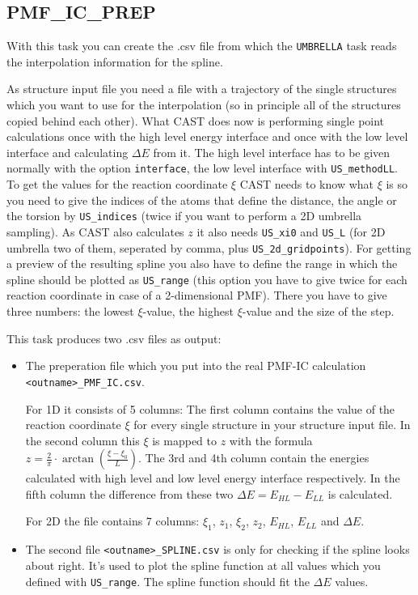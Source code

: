 \documentclass[10pt,a4paper]{article} %
\begin{document}
    \subsection{PMF\_IC\_PREP}
    
    With this task you can create the .csv file from which the \texttt{UMBRELLA} task reads the interpolation information for the spline. 
    
    As structure input file you need a file with a trajectory of the single structures which you want to use for the interpolation (so in principle all of the structures copied behind each other). What CAST does now is performing single point calculations once with the high level energy interface and once with the low level interface and calculating $\Delta E$ from it. The high level interface has to be given normally with the option \texttt{interface}, the low level interface with \texttt{US\_methodLL}. To get the values for the reaction coordinate $\xi$ CAST needs to know what $\xi$ is so you need to give the indices of the atoms that define the distance, the angle or the torsion by \texttt{US\_indices} (twice if you want to perform a 2D umbrella sampling). As CAST also calculates $z$ it also needs \texttt{US\_xi0} and \texttt{US\_L} (for 2D umbrella two of them, seperated by comma, plus \texttt{US\_2d\_gridpoints}). For getting a preview of the resulting spline you also have to define the range in which the spline should be plotted as \texttt{US\_range} (this option you have to give twice for each reaction coordinate in case of a 2-dimensional PMF). There you have to give three numbers: the lowest $\xi$-value, the highest $\xi$-value and the size of the step. 
    
    This task produces two .csv files as output: 
    \begin{itemize}
    	\item The preperation file which you put into the real PMF-IC calculation \texttt{<outname>\_PMF\_IC.csv}. 
    	
    	For 1D it consists of 5 columns: The first column contains the value of the reaction coordinate $\xi$ for every single structure in your structure input file. In the second column this $\xi$ is mapped to $z$ with the formula $z = \frac{2}{\pi} \cdot \arctan(\frac{\xi - \xi_0}{L})$. The 3rd and 4th column contain the energies calculated with high level and low level energy interface respectively. In the fifth column the difference from these two $\Delta E = E_{HL} - E_{LL}$ is calculated. 
    	
    	For 2D the file contains 7 columns: $\xi_1$, $z_1$, $\xi_2$, $z_2$, $E_{HL}$, $E_{LL}$ and $\Delta E$. 
    	\item The second file \texttt{<outname>\_SPLINE.csv} is only for checking if the spline looks about right. It's used to plot the spline function at all values which you defined with \texttt{US\_range}. The spline function should fit the $\Delta E$ values. 
    \end{itemize}
\end{document}
